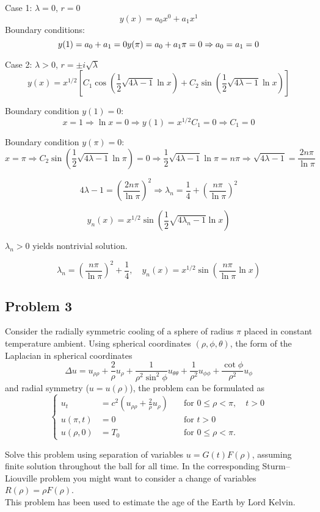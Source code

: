 \documentclass{article}
\begin{document}
Case 1: $\lambda = 0$, $r = 0$
\[
y(x) = a_0 x^0 + a_1 x^1
\]
Boundary conditions:
\[
y(1) = a_0 + a_1 = 0 \\
y(\pi) = a_0 + a_1 \pi = 0
\Rightarrow a_0 = a_1 = 0
\]

Case 2: $\lambda > 0$, $r = \pm i\sqrt{\lambda}$
\[
y(x) = x^{1/2} \left[ C_1 \cos\left( \frac{1}{2} \sqrt{4\lambda - 1} \ln x \right)
+ C_2 \sin\left( \frac{1}{2} \sqrt{4\lambda - 1} \ln x \right) \right]
\]

Boundary condition $y(1) = 0$:
\[
x = 1 \Rightarrow \ln x = 0 \Rightarrow y(1) = x^{1/2} C_1 = 0 \Rightarrow C_1 = 0
\]

Boundary condition $y(\pi) = 0$:
\[
x = \pi \Rightarrow
C_2 \sin\left( \frac{1}{2} \sqrt{4\lambda - 1} \ln \pi \right) = 0
\Rightarrow \frac{1}{2} \sqrt{4\lambda - 1} \ln \pi = n \pi
\Rightarrow \sqrt{4\lambda - 1} = \frac{2n\pi}{\ln \pi}
\]

\[
4\lambda - 1 = \left( \frac{2n\pi}{\ln \pi} \right)^2
\Rightarrow \lambda_n = \frac{1}{4} + \left( \frac{n\pi}{\ln \pi} \right)^2
\]

\[
y_n(x) = x^{1/2} \sin\left( \frac{1}{2} \sqrt{4\lambda_n - 1} \ln x \right)
\]

$\lambda_n > 0$ yields nontrivial solution.

\[
\boxed{\lambda_n = \left( \frac{n\pi}{\ln \pi} \right)^2 + \frac{1}{4}}, \quad
\boxed{y_n(x) = x^{1/2} \sin\left( \frac{n\pi}{\ln \pi} \ln x \right)}
\]

\newpage

\begin{tcolorbox}[colback=white, colframe=black, boxrule=0.8pt, arc=2mm]

\section*{Problem 3}
Consider the radially symmetric cooling of a sphere of radius $\pi$ placed in constant temperature ambient. Using spherical coordinates $(\rho, \phi, \theta)$, the form of the Laplacian in spherical coordinates 
\[
\Delta u = u_{\rho\rho} + \frac{2}{\rho} u_{\rho} + \frac{1}{\rho^2 \sin^2 \phi} u_{\theta\theta} + \frac{1}{\rho^2} u_{\phi\phi} + \frac{\cot \phi}{\rho^2} u_{\phi}
\]
and radial symmetry ($u = u(\rho)$), the problem can be formulated as
\[
\left\{
\begin{aligned}
u_t &= c^2 \left(u_{\rho\rho} + \frac{2}{\rho} u_{\rho} \right) \quad &\text{for } 0 \leq \rho < \pi, \quad t > 0 \\
u(\pi, t) &= 0 \quad &\text{for } t > 0 \\
u(\rho, 0) &= T_0 \quad &\text{for } 0 \leq \rho < \pi.
\end{aligned}
\right.
\]

Solve this problem using separation of variables $u = G(t)F(\rho)$, assuming finite solution throughout the ball for all time. In the corresponding Sturm–Liouville problem you might want to consider a change of variables $R(\rho) = \rho F(\rho)$.\\

This problem has been used to estimate the age of the Earth by Lord Kelvin.

\end{tcolorbox}
\end{document}
